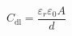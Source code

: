 \documentclass[preview]{standalone}
\begin{document}
\[C_\text{dl} = \frac{\varepsilon_r \varepsilon_0 A}{d} \tag{2.1}\]
\end{document}

